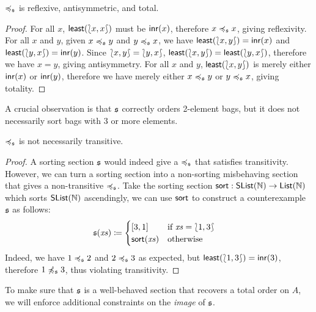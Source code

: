 \begin{proposition}
    \label{sort:almost-order}
    $\preccurlyeq_{\mathfrak{s}}$ is reflexive, antisymmetric, and total.
\end{proposition}
\begin{proof}
    For all $x$, $\operatorname{\mathsf{least}}({\lbag}{x, x}{\rbag})$ must be $\operatorname{\mathsf{inr}}(x)$, therefore $x \preccurlyeq_{\mathfrak{s}} x$, giving reflexivity.
    For all $x$ and $y$, given $x \preccurlyeq_{\mathfrak{s}} y$ and $y \preccurlyeq_{\mathfrak{s}} x$,
    we have $\operatorname{\mathsf{least}}({\lbag}{x, y}{\rbag}) = \operatorname{\mathsf{inr}}(x)$ and $\operatorname{\mathsf{least}}({\lbag}{y, x}{\rbag}) = \operatorname{\mathsf{inr}}(y)$.
    Since ${\lbag}{x, y}{\rbag} = {\lbag}{y, x}{\rbag}$, $\operatorname{\mathsf{least}}({\lbag}{x, y}{\rbag}) = \operatorname{\mathsf{least}}({\lbag}{y, x}{\rbag})$,
    therefore we have $x = y$, giving antisymmetry.
    For all $x$ and $y$, $\operatorname{\mathsf{least}}({\lbag}{x, y}{\rbag})$ is merely either $\operatorname{\mathsf{inr}}(x)$ or $\operatorname{\mathsf{inr}}(y)$,
    therefore we have merely either $x \preccurlyeq_{\mathfrak{s}} y$ or $y \preccurlyeq_{\mathfrak{s}} x$, giving totality.
\end{proof}
%
A crucial observation is that $\mathfrak{s}$ correctly orders 2-element bags,
but it does not necessarily sort bags with 3 or more elements.
\begin{proposition}
    \label{prop:counterexample-transitivity}
    $\preccurlyeq_{\mathfrak{s}}$ is not necessarily transitive.
\end{proposition}
\begin{proof}
    A sorting section $\mathfrak{s}$ would indeed give a $\preccurlyeq_{\mathfrak{s}}$
    that satisfies transitivity. However, we can turn a sorting section
    into a non-sorting misbehaving section that gives a non-transitive $\preccurlyeq_{\mathfrak{s}}$.
    Take the sorting section
    $\operatorname{\mathsf{sort}} : \operatorname{\mathsf{SList}}(\mathbb{N}) \to \operatorname{\mathsf{List}}(\mathbb{N})$ which sorts $\operatorname{\mathsf{SList}}(\mathbb{N})$ ascendingly,
    we can use $\operatorname{\mathsf{sort}}$ to construct a counterexample $\mathfrak{s}$ as follows:
    \begin{align*}
        \mathfrak{s}(\mathit{xs}) & \mathrel{\coloneq}
        \begin{cases}
            [3, 1]           & \text{if $\mathit{xs} = {\lbag}{1, 3}{\rbag}$} \\
            \operatorname{\mathsf{sort}}(\mathit{xs}) & \text{otherwise}             \\
        \end{cases}
    \end{align*}
    Indeed, we have $1 \preccurlyeq_{\mathfrak{s}} 2$ and $2 \preccurlyeq_{\mathfrak{s}} 3$ as expected,
    but $\operatorname{\mathsf{least}}({\lbag}{1, 3}{\rbag}) = \operatorname{\mathsf{inr}}(3)$, therefore $1 \not\preccurlyeq_{\mathfrak{s}} 3$,
    thus violating transitivity.
\end{proof}
%
To make sure that $\mathfrak{s}$ is a well-behaved section that recovers a total order on $A$,
we will enforce additional constraints on the \emph{image} of $\mathfrak{s}$.
